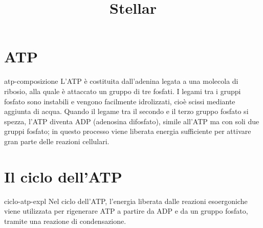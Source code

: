 \documentclass[preview]{standalone}
\begin{document}
\title{Stellar}
\genpage

\section{ATP}


\begin{snippet}{atp-composizione}
    L'ATP è costituita dall'adenina legata a una molecola di ribosio, alla quale è
    attaccato un gruppo di tre fosfati. I legami tra i gruppi fosfato sono instabili e vengono
    facilmente idrolizzati, cioè scissi mediante aggiunta di acqua. Quando il legame tra il
    secondo e il terzo gruppo fosfato si spezza, l'ATP diventa ADP (adenosina difosfato), simile
    all'ATP ma con soli due gruppi fosfato; in questo processo viene liberata energia sufficiente
    per attivare gran parte delle reazioni cellulari.
\end{snippet}


\section{Il ciclo dell'ATP}

\begin{snippet}{ciclo-atp-expl}
    Nel ciclo dell'ATP, l'energia liberata dalle reazioni esoergoniche viene utilizzata per
    rigenerare ATP a partire da ADP e da un gruppo fosfato, tramite una reazione di
    condensazione.
\end{snippet}

\end{document}
